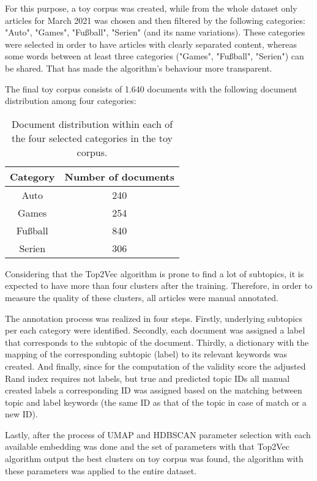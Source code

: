 \documentclass[fontsize=12pt,a4paper,twoside,openany]{scrbook}
\begin{document}
For this purpose, a toy corpus was created, while from the whole dataset only articles for March 2021 was chosen and then filtered by the following categories: "Auto", "Games", "Fußball", "Serien" (and its name variations). These categories were selected in order to have articles with clearly separated content, whereas some words between at least three categories ("Games", "Fußball", "Serien") can be shared. That has made the algorithm's behaviour more transparent.

The final toy corpus consists of 1.640 documents with the following document distribution among four categories:

\begin{table}[ht]
    \centering
    \begin{tabular}{ |c|c| } 
        \hline
        \textbf{Category} & \textbf{Number of documents} \\
        \hline
        Auto & 240 \\
        \hline
        Games & 254 \\
        \hline
        Fußball & 840 \\
        \hline
        Serien & 306 \\
        \hline
    \end{tabular}
    \caption{Document distribution within each of the four selected categories in the toy corpus.}
    \label{tab:doc_dist}
\end{table}

Considering that the Top2Vec algorithm is prone to find a lot of subtopics, it is expected to have more than four clusters after the training. Therefore, in order to measure the quality of these clusters, all articles were manual annotated. 

The annotation process was realized in four steps. Firstly, underlying subtopics per each category were identified. Secondly, each document was assigned a label that corresponds to the subtopic of the document. Thirdly, a dictionary with the mapping of the corresponding subtopic (label) to its relevant keywords was created. And finally, since for the computation of the validity score the adjusted Rand index requires not labels, but true and predicted topic IDs all manual created labels a corresponding ID was assigned based on the matching between topic and label keywords (the same ID as that of the topic in case of match or a new ID).

Lastly, after the process of UMAP and HDBSCAN parameter selection with each available embedding was done and the set of parameters with that Top2Vec algorithm output the best clusters on toy corpus was found, the algorithm with these parameters was applied to the entire dataset.
\end{document}
